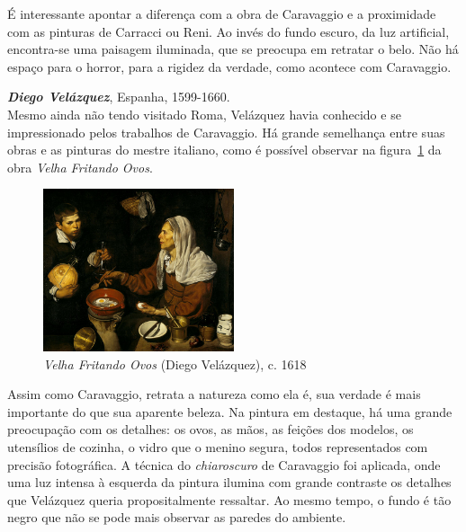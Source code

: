 É interessante apontar a diferença com a obra de Caravaggio e a
proximidade com as pinturas de Carracci ou Reni. Ao invés do fundo
escuro, da luz artificial, encontra-se uma paisagem iluminada, que se
preocupa em retratar o belo. Não há espaço para o horror, para a
rigidez da verdade, como acontece com Caravaggio.


\textbf{\emph{Diego Velázquez}}, Espanha, 1599-1660. \\ Mesmo ainda não tendo
visitado Roma, Velázquez havia conhecido e se impressionado pelos
trabalhos de Caravaggio. Há grande semelhança entre suas obras e as
pinturas do mestre italiano, como é possível observar na
figura~\ref{fig:velazquez:velha} da obra
\textit{Velha Fritando Ovos}.

\begin{figure}
  \vspace{-45pt}
  \begin{centering}
    \caption{\emph{Velha Fritando Ovos} (Diego Velázquez), c. 1618}
    \label{fig:velazquez:velha}
    \includegraphics[width=0.5\textwidth]{figs/velazquez_velha.png}
  \end{centering}
\end{figure}

Assim como Caravaggio, retrata a natureza como ela é, sua verdade é
mais importante do que sua aparente beleza. Na pintura em destaque, há
uma grande preocupação com os detalhes: os ovos, as mãos, as feições
dos modelos, os utensílios de cozinha, o vidro que o menino segura,
todos representados com precisão fotográfica. A técnica do
\textit{chiaroscuro} de Caravaggio foi aplicada, onde uma luz intensa à
esquerda da pintura ilumina com grande contraste os detalhes que
Velázquez queria propositalmente ressaltar. Ao mesmo tempo, o fundo é
tão negro que não se pode mais observar as paredes do
ambiente.~\cite{gombrich}

